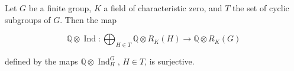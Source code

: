 Let $G$ be a finite group, $K$ a field of characteristic zero, and $T$ the set of cyclic subgroups of $G$. Then the map

$$\mathbb{Q} \otimes \operatorname{Ind} : \bigoplus_{H \in T} \mathbb{Q} \otimes R_K(H) \rightarrow \mathbb{Q} \otimes R_K(G)$$

defined by the maps $\mathbb{Q} \otimes \operatorname{Ind}_H^G$, $H \in T$, is surjective.
